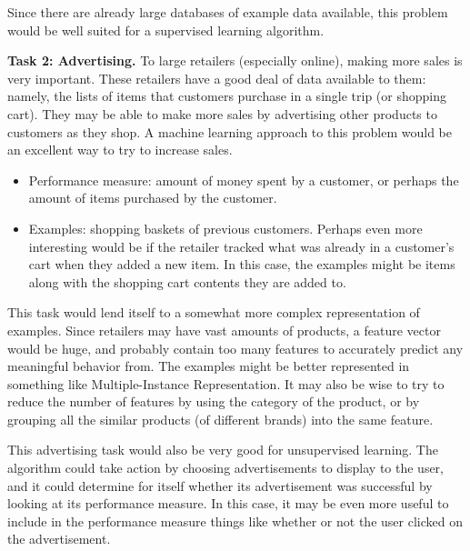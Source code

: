 \documentclass[fleqn]{homework}
\begin{document}
\begin{problem}{3}
    Since there are already large databases of example data available, this
    problem would be well suited for a supervised learning algorithm.

    \textbf{Task 2: Advertising.}  To large retailers (especially online),
    making more sales is very important.  These retailers have a good deal of
    data available to them: namely, the lists of items that customers purchase
    in a single trip (or shopping cart).  They may be able to make more sales by
    advertising other products to customers as they shop.  A machine learning
    approach to this problem would be an excellent way to try to increase sales.

    \begin{itemize}
    \item Performance measure: amount of money spent by a customer, or perhaps
      the amount of items purchased by the customer.
    \item Examples: shopping baskets of previous customers.  Perhaps even more
      interesting would be if the retailer tracked what was already in a
      customer's cart when they added a new item.  In this case, the examples
      might be items along with the shopping cart contents they are added to.
    \end{itemize}

    This task would lend itself to a somewhat more complex representation of
    examples.  Since retailers may have vast amounts of products, a feature
    vector would be huge, and probably contain too many features to accurately
    predict any meaningful behavior from.  The examples might be better
    represented in something like Multiple-Instance Representation.  It may also
    be wise to try to reduce the number of features by using the category of the
    product, or by grouping all the similar products (of different brands) into
    the same feature.

    This advertising task would also be very good for unsupervised learning.
    The algorithm could take action by choosing advertisements to display to the
    user, and it could determine for itself whether its advertisement was
    successful by looking at its performance measure.  In this case, it may be
    even more useful to include in the performance measure things like whether
    or not the user clicked on the advertisement.
  \end{problem}
\end{document}
